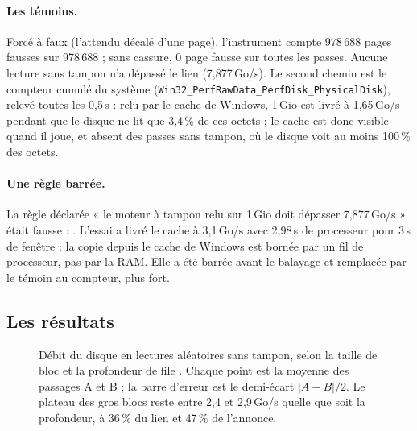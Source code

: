 \paragraph{Les témoins.} Forcé à faux (l'attendu décalé d'une page), l'instrument compte 978\,688 pages fausses sur 978\,688 ; sans cassure, 0 page fausse sur toutes les passes. Aucune lecture sans tampon n'a dépassé le lien (7,877\,Go/s). Le second chemin est le compteur cumulé du système (\texttt{Win32\_PerfRawData\_PerfDisk\_PhysicalDisk}), relevé toutes les 0,5\,s : relu par le cache de Windows, 1\,Gio est livré à 1,65\,Go/s pendant que le disque ne lit que 3,4\,\% de ces octets ; le cache est donc visible quand il joue, et absent des passes sans tampon, où le disque voit au moins 100\,\% des octets.

\paragraph{Une règle barrée.} La règle déclarée « le moteur à tampon relu sur 1\,Gio doit dépasser 7,877\,Go/s » était fausse : . L'essai a livré le cache à 3,1\,Go/s avec 2,98\,s de processeur pour 3\,s de fenêtre : la copie depuis le cache de Windows est bornée par un fil de processeur, pas par la RAM. Elle a été barrée avant le balayage et remplacée par le témoin au compteur, plus fort.

\subsection{Les résultats}

\begin{figure}[ht]
\centering
\GrapheDisque
\caption[Débit du disque selon la taille de bloc et la profondeur de file]{Débit du disque en lectures aléatoires sans tampon, selon la taille de bloc et la profondeur de file \mes. Chaque point est la moyenne des passages A et B ; la barre d'erreur est le demi-écart $|A-B|/2$. Le plateau des gros blocs reste entre 2,4 et 2,9\,Go/s quelle que soit la profondeur, à 36\,\% du lien et 47\,\% de l'annonce.}
\label{fig:disque}
\end{figure}

